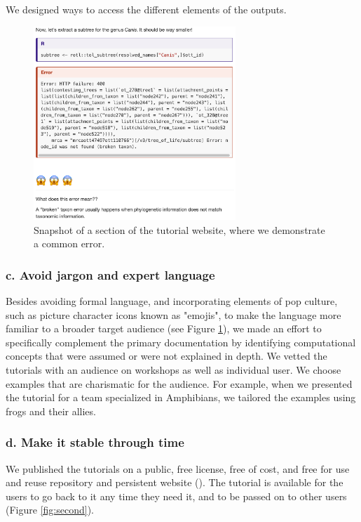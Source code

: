 \documentclass[12pt]{article}
\begin{document}
We designed ways to access the different elements of the outputs.

\begin{figure}
\begin{center}
\includegraphics[width=3in]{fig1.png}
\end{center}
\caption{Snapshot of a section of the tutorial website, where we demonstrate a common error. \label{fig:first}}
\end{figure}

\subsubsection*{c. Avoid jargon and expert language}

Besides avoiding formal language, and incorporating elements of pop culture, such as picture
character icons known as "emojis", to make the language more familiar to a
broader target audience (see Figure \ref{fig:first}), we made an effort to specifically
complement the primary documentation by identifying
computational concepts that were assumed or were not explained in depth.
We vetted the tutorials with an audience on workshops as well as individual user.
We choose examples that are charismatic for the audience.
For example, when we presented the tutorial for a team specialized in Amphibians,
we tailored the examples using frogs and their allies.


\subsubsection*{d. Make it stable through time}

We published the tutorials on a public, free license, free of cost, and free for
use and reuse repository and persistent website (\cite{RopentreeTutorials, RopentreeTutorialsWebsite}).
The tutorial is available for the users to go back to it any time they need it,
and to be passed on to other users (Figure \ref{fig:second}).
\end{document}
